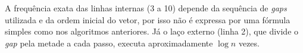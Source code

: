 \vspace{1cm} %

\qquad A frequência exata das linhas internas (3 a 10) depende da sequência de \textit{gaps} utilizada e da ordem inicial do vetor, por isso não é expressa por uma fórmula simples como nos algoritmos anteriores. Já o laço externo (linha 2), que divide o \textit{gap} pela metade a cada passo, executa aproximadamente $\log n$ vezes.